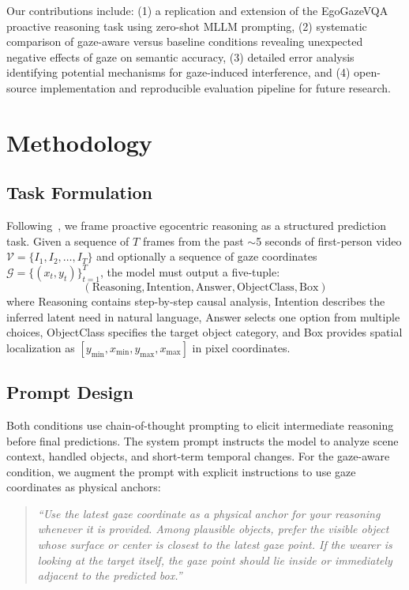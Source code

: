 \documentclass[11pt]{article}
\begin{document}
Our contributions include: (1) a replication and extension of the EgoGazeVQA proactive reasoning task using zero-shot MLLM prompting, (2) systematic comparison of gaze-aware versus baseline conditions revealing unexpected negative effects of gaze on semantic accuracy, (3) detailed error analysis identifying potential mechanisms for gaze-induced interference, and (4) open-source implementation and reproducible evaluation pipeline for future research.

\section{Methodology}

\subsection{Task Formulation}
Following~\citet{peng2025eye}, we frame proactive egocentric reasoning as a structured prediction task. Given a sequence of $T$ frames from the past $\sim$5 seconds of first-person video $\mathcal{V} = \{I_1, I_2, \dots, I_T\}$ and optionally a sequence of gaze coordinates $\mathcal{G} = \{(x_t, y_t)\}_{t=1}^T$, the model must output a five-tuple:
\begin{equation}
    (\text{Reasoning}, \text{Intention}, \text{Answer}, \text{ObjectClass}, \text{Box})
\end{equation}
where Reasoning contains step-by-step causal analysis, Intention describes the inferred latent need in natural language, Answer selects one option from multiple choices, ObjectClass specifies the target object category, and Box provides spatial localization as $[y_{\min}, x_{\min}, y_{\max}, x_{\max}]$ in pixel coordinates.

\subsection{Prompt Design}
Both conditions use chain-of-thought prompting to elicit intermediate reasoning before final predictions. The system prompt instructs the model to analyze scene context, handled objects, and short-term temporal changes. For the gaze-aware condition, we augment the prompt with explicit instructions to use gaze coordinates as physical anchors:

\begin{quote}
\small
\textit{``Use the latest gaze coordinate as a physical anchor for your reasoning whenever it is provided. Among plausible objects, prefer the visible object whose surface or center is closest to the latest gaze point. If the wearer is looking at the target itself, the gaze point should lie inside or immediately adjacent to the predicted box.''}
\end{quote}
\end{document}

